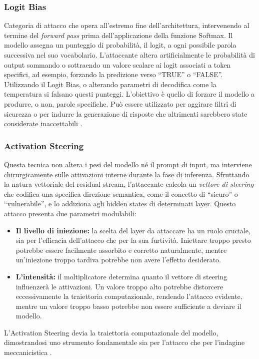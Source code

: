 \subsubsection{Logit Bias} 
Categoria di attacco che opera all'estremo fine dell'architettura, intervenendo al termine del \textit{forward pass} prima dell'applicazione della funzione Softmax. 
Il modello assegna un punteggio di probabilità, il logit, a ogni possibile parola successiva nel suo vocabolario. L'attaccante altera artificialmente le probabilità di output sommando o sottraendo un valore scalare ai logit associati a token specifici, ad esempio, forzando la predizione verso \enquote{TRUE} o \enquote{FALSE}. 
Utilizzando il Logit Bias, o alterando parametri di decodifica come la temperatura si falsano questi punteggi.
L'obiettivo è quello di forzare il modello a produrre, o non, parole specifiche.
Può essere utilizzato per aggirare filtri di sicurezza o per indurre la generazione di risposte che altrimenti sarebbero state considerate inaccettabili \cite{dathathri2020plugplaylanguagemodels}.

\subsubsection{Activation Steering}
Questa tecnica non altera i pesi del modello né il prompt di input, ma interviene chirurgicamente sulle attivazioni interne durante la fase di inferenza. Sfruttando la natura vettoriale del residual stream, l'attaccante calcola un \textit{vettore di steering} che codifica una specifica direzione semantica, come il concetto di \enquote{sicuro} o \enquote{vulnerabile}, e lo addiziona agli hidden states di determinati layer. 
Questo attacco presenta due parametri modulabili:
\begin{itemize}
    \item \textbf{Il livello di iniezione:} la scelta  del layer da attaccare ha un ruolo cruciale, sia per l'efficacia dell'attacco che per la sua furtività. Iniettare troppo presto potrebbe essere facilmente assorbito e corretto naturalmente, mentre un'iniezione troppo tardiva potrebbe non avere l'effetto desiderato.
    \item \textbf{L'intensità:} il moltiplicatore determina quanto il vettore di steering influenzerà le attivazioni. Un valore troppo alto potrebbe distorcere eccessivamente la traiettoria computazionale, rendendo l'attacco evidente, mentre un valore troppo basso potrebbe non essere sufficiente a deviare il modello.
\end{itemize} 
L'Activation Steering devia la traiettoria computazionale del modello, dimostrandosi uno strumento fondamentale sia per l'attacco che per l'indagine meccanicistica \cite{vu2025angularsteeringbehaviorcontrol}.